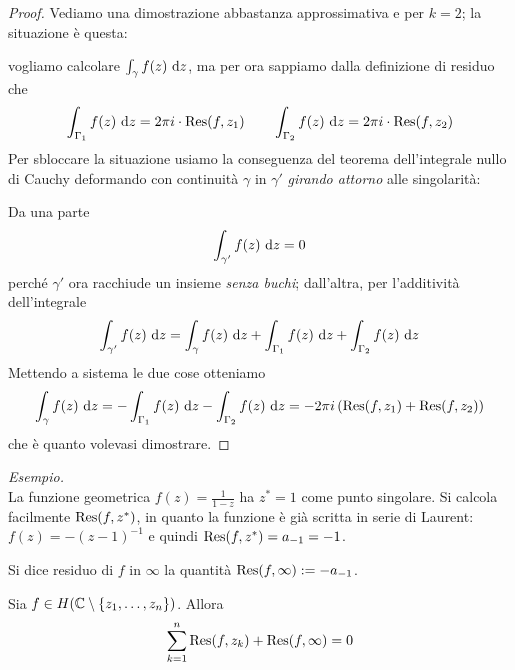 \begin{proof} 
Vediamo una dimostrazione abbastanza approssimativa e per $k=2$; la situazione è questa:


vogliamo calcolare $\int_{\gamma}f(z)\  \mathrm{d} z$, ma per ora sappiamo dalla definizione di residuo che
$$\int_{\Gamma_1}f(z)\  \mathrm{d} z=2\pi i\cdot \operatorname{Res}(f,z_1) \qquad \int_{\Gamma_2}f(z)\  \mathrm{d} z=2\pi i\cdot \operatorname{Res}(f,z_2)$$
Per sbloccare la situazione usiamo la conseguenza del teorema dell'integrale nullo di Cauchy deformando con continuità $\gamma$ in $\gamma'$ \textit{girando attorno} alle singolarità:


Da una parte 
$$\int_{\gamma'}f(z)\  \mathrm{d} z=0$$
perché $\gamma'$ ora racchiude un insieme \textit{senza buchi}; dall'altra, per l'additività dell'integrale 
$$
\int_{\gamma'}f(z)\  \mathrm{d} z=\int_\gamma f(z)\  \mathrm{d} z+\int_{\Gamma_1}f(z)\  \mathrm{d} z+\int_{\Gamma_2}f(z)\  \mathrm{d} z
$$
Mettendo a sistema le due cose otteniamo
\begin{equation*}
\int_\gamma f(z)\  \mathrm{d} z=-\int_{\Gamma_1}f(z)\  \mathrm{d} z-\int_{\Gamma_2}f(z)\  \mathrm{d} z=-2\pi i\left(\operatorname{Res}(f,z_1)+\operatorname{Res}(f,z_2)\right)
\end{equation*}
che è quanto volevasi dimostrare.
\end{proof}

\textit{Esempio.}\\
La funzione geometrica $f(z)=\frac{1}{1-z}$ ha $z^*=1$ come punto singolare. Si calcola facilmente $\operatorname{Res}(f,z^*)$, in quanto la funzione è già scritta in serie di Laurent: $f(z)=-(z-1)^{-1}$ e quindi $\operatorname{Res}(f,z^*)=a_{-1}=-1$.

\begin{defn}
Si dice residuo di $f$ in $\infty$ la quantità $\operatorname{Res}(f,\infty):=-a_{-1}$.
\end{defn}

\newpage

\begin{thm}
Sia $f\in H(\mathbb{C}\setminus\{z_1,\dotsc,z_n\})$. Allora
\begin{equation*}
\sum\limits^{n}_{k = 1}\operatorname{Res} (f, z_{k}) + \operatorname{Res} (f, \infty) = 0
\end{equation*}
\end{thm}

